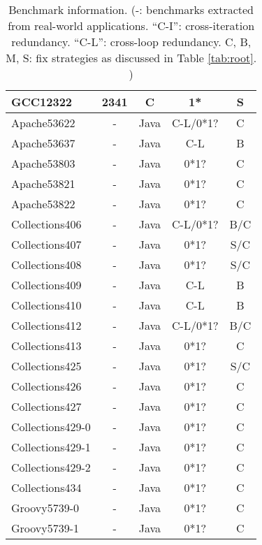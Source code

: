 \begin{table}
\begin{tabular}{lcccc}
   GCC12322              & 2341            & C                      &  1*          & S\\
   \midrule
   \midrule
Apache53622	  	 &  -		   &Java		    &C-L/0*1?	   &C\\
Apache53637		 &  -		   &Java		    &C-L	   &B\\
Apache53803		 &  -		   &Java		    &0*1?	   &C\\
Apache53821	         &  -		   &Java		    &0*1?	   &C\\
Apache53822	         &  -		   &Java		    &0*1?	   &C\\		
\midrule
Collections406&  -		   &Java		    &C-L/0*1?	   &B/C\\
Collections407&  -		   &Java		    &0*1?	   &S/C\\
Collections408&  -		   &Java		    &0*1?	   &S/C\\
Collections409&  -		   &Java		    &C-L	   &B\\
Collections410&  -		   &Java		    &C-L	   &B\\
Collections412&  -		   &Java		    &C-L/0*1?	   &B/C\\
Collections413&  -		   &Java		    &0*1?	   &C\\
Collections425&  -		   &Java		    &0*1?	   &S/C\\
Collections426&  -		   &Java		    &0*1?	   &C\\
Collections427&  -		   &Java		    &0*1?	   &C\\
Collections429-0&  -		   &Java		    &0*1?	   &C\\
Collections429-1&  -		   &Java		    &0*1?	   &C\\
Collections429-2&  -		   &Java		    &0*1?	   &C\\
Collections434&  -		   &Java		    &0*1?	   &C\\
\midrule
Groovy5739-0&  -		   &Java		    &0*1?	   &C\\
Groovy5739-1&  -		   &Java		    &0*1?	   &C\\
\bottomrule
   \end{tabular}
  \caption{Benchmark information.
  (-: benchmarks extracted from real-world applications.
  ``C-I'': cross-iteration redundancy.
  ``C-L'': cross-loop redundancy.
  C, B, M, S: fix strategies as discussed in
  Table \ref{tab:root}.
  ) 
 }
  \label{tab:benchmarks}
\end{table}



